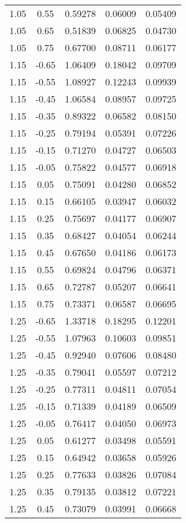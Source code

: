\begin{longtable}{ccccc}
1.05 & 0.55 & 0.59278 & 0.06009 & 0.05409 \\ 
1.05 & 0.65 & 0.51839 & 0.06825 & 0.04730 \\ 
1.05 & 0.75 & 0.67700 & 0.08711 & 0.06177 \\ \hline
1.15 & -0.65 & 1.06409 & 0.18042 & 0.09709 \\ 
1.15 & -0.55 & 1.08927 & 0.12243 & 0.09939 \\ 
1.15 & -0.45 & 1.06584 & 0.08957 & 0.09725 \\ 
1.15 & -0.35 & 0.89322 & 0.06582 & 0.08150 \\ 
1.15 & -0.25 & 0.79194 & 0.05391 & 0.07226 \\ 
1.15 & -0.15 & 0.71270 & 0.04727 & 0.06503 \\ 
1.15 & -0.05 & 0.75822 & 0.04577 & 0.06918 \\ 
1.15 & 0.05 & 0.75091 & 0.04280 & 0.06852 \\ 
1.15 & 0.15 & 0.66105 & 0.03947 & 0.06032 \\ 
1.15 & 0.25 & 0.75697 & 0.04177 & 0.06907 \\ 
1.15 & 0.35 & 0.68427 & 0.04054 & 0.06244 \\ 
1.15 & 0.45 & 0.67650 & 0.04186 & 0.06173 \\ 
1.15 & 0.55 & 0.69824 & 0.04796 & 0.06371 \\ 
1.15 & 0.65 & 0.72787 & 0.05207 & 0.06641 \\ 
1.15 & 0.75 & 0.73371 & 0.06587 & 0.06695 \\ \hline
1.25 & -0.65 & 1.33718 & 0.18295 & 0.12201 \\ 
1.25 & -0.55 & 1.07963 & 0.10603 & 0.09851 \\ 
1.25 & -0.45 & 0.92940 & 0.07606 & 0.08480 \\ 
1.25 & -0.35 & 0.79041 & 0.05597 & 0.07212 \\ 
1.25 & -0.25 & 0.77311 & 0.04811 & 0.07054 \\ 
1.25 & -0.15 & 0.71339 & 0.04189 & 0.06509 \\ 
1.25 & -0.05 & 0.76417 & 0.04050 & 0.06973 \\ 
1.25 & 0.05 & 0.61277 & 0.03498 & 0.05591 \\ 
1.25 & 0.15 & 0.64942 & 0.03658 & 0.05926 \\ 
1.25 & 0.25 & 0.77633 & 0.03826 & 0.07084 \\ 
1.25 & 0.35 & 0.79135 & 0.03812 & 0.07221 \\ 
1.25 & 0.45 & 0.73079 & 0.03991 & 0.06668 \\ 

\end{longtable}
